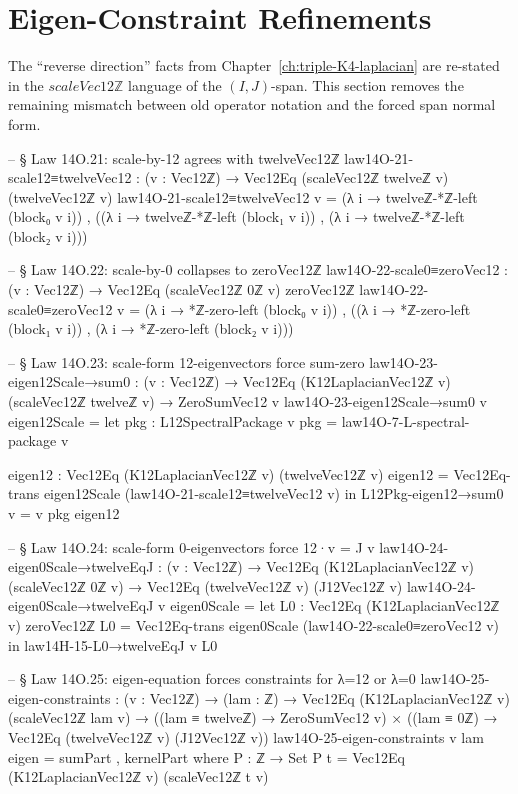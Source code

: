\documentclass[11pt,a4paper]{book}
\def\texttt#1{#1}%
\begin{document}
\section{Eigen-Constraint Refinements}

The ``reverse direction'' facts from Chapter~\ref{ch:triple-K4-laplacian}
are re-stated in the $\texttt{scaleVec12ℤ}$ language of the $(I,J)$-span.  This
section removes the remaining mismatch between old operator notation and the
forced span normal form.

\begin{code}
-- § Law 14O.21: scale-by-12 agrees with twelveVec12ℤ
law14O-21-scale12≡twelveVec12 : (v : Vec12ℤ) → Vec12Eq (scaleVec12ℤ twelveℤ v) (twelveVec12ℤ v)
law14O-21-scale12≡twelveVec12 v =
  (λ i → twelveℤ-*ℤ-left (block₀ v i)) ,
  ((λ i → twelveℤ-*ℤ-left (block₁ v i)) ,
   (λ i → twelveℤ-*ℤ-left (block₂ v i)))

-- § Law 14O.22: scale-by-0 collapses to zeroVec12ℤ
law14O-22-scale0≡zeroVec12 : (v : Vec12ℤ) → Vec12Eq (scaleVec12ℤ 0ℤ v) zeroVec12ℤ
law14O-22-scale0≡zeroVec12 v =
  (λ i → *ℤ-zero-left (block₀ v i)) ,
  ((λ i → *ℤ-zero-left (block₁ v i)) ,
   (λ i → *ℤ-zero-left (block₂ v i)))

-- § Law 14O.23: scale-form 12-eigenvectors force sum-zero
law14O-23-eigen12Scale→sum0 : (v : Vec12ℤ) →
  Vec12Eq (K12LaplacianVec12ℤ v) (scaleVec12ℤ twelveℤ v) → ZeroSumVec12 v
law14O-23-eigen12Scale→sum0 v eigen12Scale =
  let
    pkg : L12SpectralPackage v
    pkg = law14O-7-L-spectral-package v

    eigen12 : Vec12Eq (K12LaplacianVec12ℤ v) (twelveVec12ℤ v)
    eigen12 = Vec12Eq-trans eigen12Scale (law14O-21-scale12≡twelveVec12 v)
  in
  L12Pkg-eigen12→sum0 {v = v} pkg eigen12

-- § Law 14O.24: scale-form 0-eigenvectors force 12·v = J v
law14O-24-eigen0Scale→twelveEqJ : (v : Vec12ℤ) →
  Vec12Eq (K12LaplacianVec12ℤ v) (scaleVec12ℤ 0ℤ v) → Vec12Eq (twelveVec12ℤ v) (J12Vec12ℤ v)
law14O-24-eigen0Scale→twelveEqJ v eigen0Scale =
  let
    L0 : Vec12Eq (K12LaplacianVec12ℤ v) zeroVec12ℤ
    L0 = Vec12Eq-trans eigen0Scale (law14O-22-scale0≡zeroVec12 v)
  in
  law14H-15-L0→twelveEqJ v L0

-- § Law 14O.25: eigen-equation forces constraints for λ=12 or λ=0
law14O-25-eigen-constraints : (v : Vec12ℤ) → (lam : ℤ) →
  Vec12Eq (K12LaplacianVec12ℤ v) (scaleVec12ℤ lam v) →
  ((lam ≡ twelveℤ) → ZeroSumVec12 v) ×
  ((lam ≡ 0ℤ) → Vec12Eq (twelveVec12ℤ v) (J12Vec12ℤ v))
law14O-25-eigen-constraints v lam eigen = sumPart , kernelPart
  where
    P : ℤ → Set
    P t = Vec12Eq (K12LaplacianVec12ℤ v) (scaleVec12ℤ t v)


\end{code}
\end{document}
